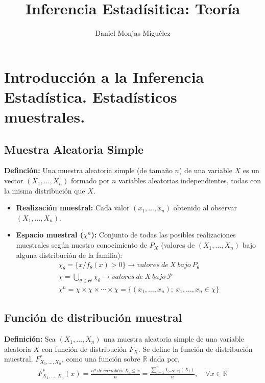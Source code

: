 \documentclass{article}
\author{Daniel Monjas Miguélez}
\title{Inferencia Estadísitica: Teoría}
\begin{document}
\maketitle

\newpage

\tableofcontents

\newpage

\section{Introducción a la Inferencia Estadística. Estadísticos muestrales.}

\subsection{Muestra Aleatoria Simple}
\textbf{Definción:} Una muestra aleatoria simple (de tamaño $n$) de una variable $X$ es un vector $(X_1,\ldots,X_n)$ formado por $n$ variables aleatorias independientes, todas con la misma distribución que $X$.

\begin{itemize}
\item \textbf{Realización muestral:} Cada valor $(x_1,\ldots, x_n)$ obtenido al observar $(X_1,\ldots,X_n)$.

\item \textbf{Espacio muestral ($\chi^n$):} Conjunto de todas las posibles realizaciones muestrales según nuestro conocimiento de $P_X$ (valores de $(X_1,\ldots,X_n)$ bajo alguna distribución de la familia):
\begin{gather*}
\chi_\theta = \{x/f_\theta(x)>0\}\rightarrow valores\:de\:X\:bajo\:P_\theta\\
\chi =\bigcup_{\theta\in \Theta} \chi_\theta \rightarrow valores\:de\:X\:bajo\:\mathcal{P}\\
\chi^n=\chi\times \chi\times\cdots\times \chi = \{(x_1,\ldots,x_n);\:x_1,\ldots,x_n\in \chi\}
\end{gather*}
\end{itemize}

\subsection{Función de distribución muestral}
\textbf{Definición:} Sea $(X_1,\ldots,X_n)$ una muestra aleatoria simple de una variable aleatoria $X$ con función de distribución $F_X$. Se define la función de distribución muestral, $F_{X_1,\ldots,X_n}^*$, como una función sobre $\mathbb{R}$ dada por,
\begin{gather*}
F_{X_1,\ldots,X_n}^*(x)=\frac{nº\:de\:variables\:X_i\leq x}{n}=\frac{\sum_{i=1}^n I_{(-\infty,x]}(X_i)}{n},\quad \forall x\in\mathbb{R}
\end{gather*}
\end{document}

